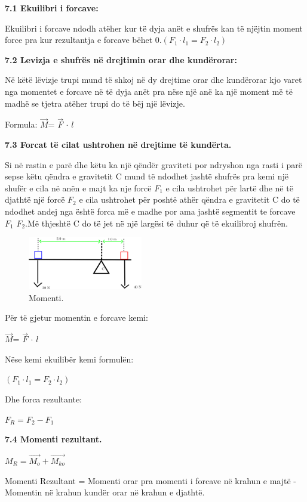 \documentclass[twocolumn]{article}
\begin{document}
	\textbf{7.1 Ekuilibri i forcave:}
	
	
	
	Ekuilibri i forcave ndodh atëher kur të dyja anët e shufrës kan të njëjtin moment
	force pra kur rezultantja e forcave bëhet 0.$(F_1 \cdot l_1 = F_2 \cdot l_2)
	$
	
	\textbf{7.2 Levizja e shufrës në drejtimin orar dhe kundërorar:}
	
	Në këtë lëvizje trupi mund të shkoj në dy drejtime orar dhe kundërorar kjo varet
	nga momentet e forcave në të dyja anët pra nëse një anë ka një moment më të
	madhë se tjetra atëher trupi do të bëj një lëvizje.
	
	Formula: $\vec{M}$= $\vec{F}$ $\cdot$ $l$
	
	\textbf{7.3 Forcat të cilat ushtrohen në drejtime të kundërta.}
	
	Si në rastin e parë dhe këtu ka një qëndër graviteti por ndryshon nga rasti i parë
	sepse këtu qëndra e gravitetit C mund të ndodhet jashtë shufrës pra kemi një shufër
	e cila në anën e majt ka nje forcë $F_1$ e cila ushtrohet për lartë dhe në të djathtë një
	forcë $F_2$ e cila ushtrohet për poshtë athër qëndra e gravitetit C do të ndodhet andej
	nga është forca më e madhe por ama jashtë segmentit te forcave $F_1$ $F_2$.Më thjeshtë
	C do të jet në një largësi të duhur që të ekuilibroj shufrën.
	
	\begin{figure}[h]
		\includegraphics[width=50mm]{Imazhet/momenti.png}
		\caption{Momenti.}
		\label{fig:boat1}
	\end{figure}
	
	Për të gjetur momentin e forcave kemi:
	
	$\vec{M}$= $\vec{F}$ $\cdot$ $l$
	
	Nëse kemi ekuilibër kemi formulën:
	
	$(F_1 \cdot l_1 = F_2 \cdot l_2)$
	
	Dhe forca rezultante:
	
	$F_R =F_2-F_1$
	
	\textbf{7.4 Momenti rezultant.}
	
	$M_R=\vec{M_o}+\vec{M_{ko}}$
	
	Momenti Rezultant = Momenti orar pra momenti i forcave në krahun e majtë -
	Momentin në krahun kundër orar në krahun e djathtë.
	
\end{document}
